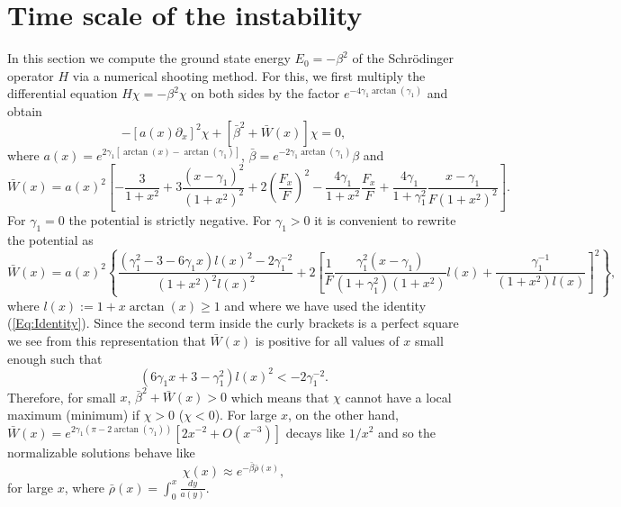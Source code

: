 \documentclass[           %
               showpacs,            %
               preprintnumbers,     %
               aps,                 %
               prd,                 %
               superscriptaddress,      %
               nofootinbib,         %
               tightenlines,        %
               floats,floatfix      %
               ]{revtex4}
\begin{document}
\section{Time scale of the instability}
\label{Sec:TimeScale}

In this section we compute the ground state energy $E_0 = -\beta^2$ of
the Schr\"odinger operator $H$ via a numerical shooting method. For
this, we first multiply the differential equation $H\chi =
-\beta^2\chi$ on both sides by the factor
$e^{-4\gamma_1\arctan(\gamma_1)}$ and obtain
\begin{equation}
-\left[ a(x)\partial_x \right]^2\chi 
 + \left[ \bar{\beta}^2 + \bar{W}(x) \right]\chi = 0,
\label{Eq:DiffEq}
\end{equation}
where $a(x) = e^{2\gamma_1[\arctan(x) - \arctan(\gamma_1)]}$,
$\bar{\beta} = e^{-2\gamma_1\arctan(\gamma_1)}\beta$ and
\begin{displaymath}
\bar{W}(x) = a(x)^2\left[ -\frac{3}{1+x^2} + 3\frac{(x-\gamma_1)^2}{(1+x^2)^2} 
 + 2\left( \frac{F_x}{F} \right)^2 - \frac{4\gamma_1}{1+x^2}\frac{F_x}{F}
 + \frac{4\gamma_1}{1+\gamma_1^2}\frac{x-\gamma_1}{F(1+x^2)^2} \right].
\end{displaymath}
For $\gamma_1=0$ the potential is strictly negative. For $\gamma_1 >
0$ it is convenient to rewrite the potential as
\begin{displaymath}
\bar{W}(x) = a(x)^2\left\{  
\frac{(\gamma_1^2 - 3 - 6\gamma_1 x) l(x)^2 - 2\gamma_1^{-2}}
     {(1+x^2)^2 l(x)^2}
 + 2\left[ \frac{1}{F}\frac{\gamma_1^2(x-\gamma_1)}{(1+\gamma_1^2)(1+x^2)}
 l(x) + \frac{\gamma_1^{-1}}{(1+x^2) l(x)} \right]^2
 \right\},
\end{displaymath}
where $l(x) := 1 + x\arctan(x) \geq 1$ and where we have used the
identity (\ref{Eq:Identity}). Since the second term inside the curly
brackets is a perfect square we see from this representation that
$\bar{W}(x)$ is positive for all values of $x$ small enough such that
\begin{equation}
(6\gamma_1 x + 3 - \gamma_1^2)l(x)^2 < -2\gamma_1^{-2}.
\label{Eq:Inequality}
\end{equation}
Therefore, for small $x$, $\bar{\beta}^2 + \bar{W}(x) > 0$ which means
that $\chi$ cannot have a local maximum (minimum) if $\chi > 0$ ($\chi
< 0$). For large $x$, on the other hand, $\bar{W}(x) =
e^{2\gamma_1(\pi - 2\arctan(\gamma_1))}\left[ 2x^{-2} + O(x^{-3})
\right]$ decays like $1/x^2$ and so the normalizable solutions behave
like
\begin{equation}
\chi(x) \approx e^{-\bar{\beta}\bar{\rho}(x)},
\label{Eq:AsymSol}
\end{equation}
for large $x$, where $\bar{\rho}(x) = \int_0^x\frac{dy}{a(y)}$.
\end{document}
